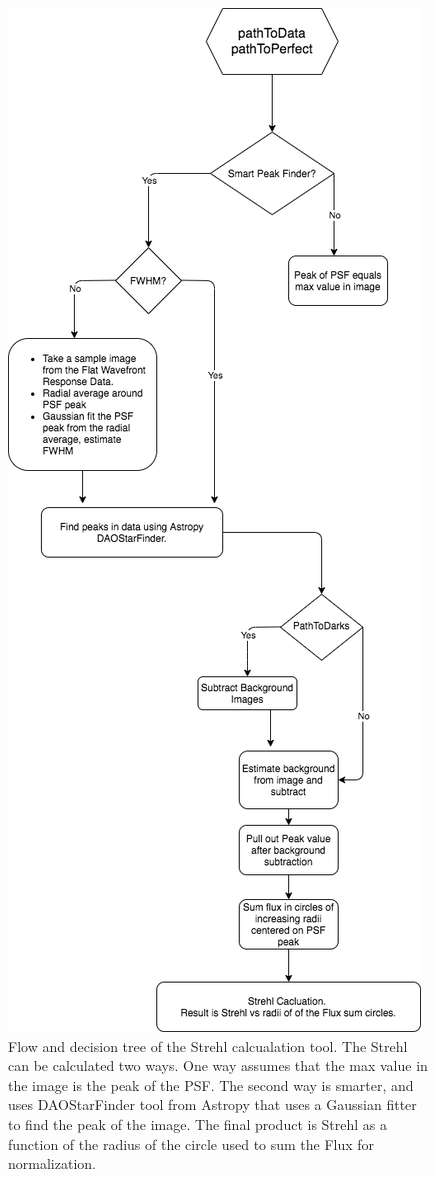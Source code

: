 \documentclass[12pt]{spieman}  %
\begin{document}
\begin{spacing}{2}
\begin{figure}
    \centering
    \includegraphics[scale=0.5]{strehlclass2.png}
    \caption{Flow and decision tree of the Strehl calcualation tool. The Strehl can be calculated two ways. One way assumes that the max value in the image is the peak of the PSF. The second way is smarter, and uses DAOStarFinder tool from Astropy that uses a Gaussian fitter to find the peak of the image. The final product is Strehl as a function of the radius of the circle used to sum the Flux for normalization. }
    \label{fig:strehlClass}
\end{figure}


\end{spacing}
\end{document}
